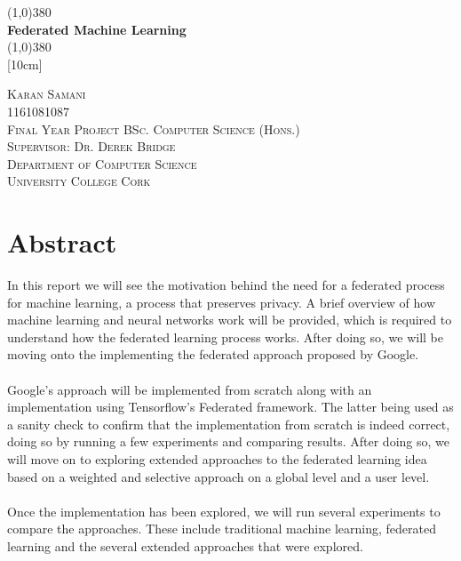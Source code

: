 \documentclass[12pt]{article}
\begin{document}
\makeatletter

\begin{titlepage}
	\begin{center}
		\line(1,0){380}\\				
		[0.32cm]
		\huge{\bfseries Federated Machine Learning}\\
		[0.16cm]		
		\line(1,0){380}\\
		[10cm]
	\end{center}
	\begin{center}
		\textsc{\large Karan Samani}\\
		\textsc{\large 1161081087}\\
		\textsc{\large Final Year Project BSc. Computer Science (Hons.)}\\
		\textsc{\large Supervisor: Dr. Derek Bridge}\\
		\textsc{\large Department of Computer Science}\\
		\textsc{\large University College Cork}\\
		\textsc{\large \@date}
	\end{center}
\end{titlepage}
\cleardoublepage

\section*{Abstract}
In this report we will see the motivation behind the need for a federated process for machine learning, a process that preserves privacy. A brief overview of how machine learning and neural networks work will be provided, which is required to understand how the federated learning process works. After doing so, we will be moving onto the implementing the federated approach proposed by Google.
\\\\
Google's approach will be implemented from scratch along with an implementation using Tensorflow's Federated framework. The latter being used as a sanity check to confirm that the implementation from scratch is indeed correct, doing so by running a few experiments and comparing results. After doing so, we will move on to exploring extended approaches to the federated learning idea based on a weighted and selective approach on a global level and a user level.
\\\\ 
Once the implementation has been explored, we will run several experiments to compare the approaches. These include traditional machine learning, federated learning and the several extended approaches that were explored.
\clearpage
\end{document}
